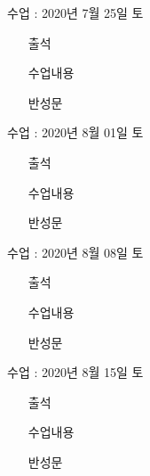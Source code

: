 \documentclass[aspectratio=1610,17pt,xcolor=pdftex,dvipsnames,table,handout]{beamer}
\begin{document}
		\begin{frame} [t,plain]
			\begin{block} {수업 : 2020년 7월 25일 토}

			\setlength{\leftmargini}{5em}			
			\begin{itemize}
				\item [출석] 
				\item [수업내용] 
				\item [반성문] 
			\end{itemize}
			\end{block}
		\end{frame}

		\begin{frame} [t,plain]
			\begin{block} {수업 : 2020년 8월 01일 토}

			\setlength{\leftmargini}{5em}			
			\begin{itemize}
				\item [출석] 
				\item [수업내용] 
				\item [반성문] 
			\end{itemize}
			\end{block}
		\end{frame}

		\begin{frame} [t,plain]
			\begin{block} {수업 : 2020년 8월 08일 토}

			\setlength{\leftmargini}{5em}			
			\begin{itemize}
				\item [출석] 
				\item [수업내용] 
				\item [반성문] 
			\end{itemize}
			\end{block}
		\end{frame}


		\begin{frame} [t,plain]
			\begin{block} {수업 : 2020년 8월 15일 토}

			\setlength{\leftmargini}{5em}			
			\begin{itemize}
				\item [출석] 
				\item [수업내용] 
				\item [반성문] 
			\end{itemize}
			\end{block}
		\end{frame}
\end{document}
